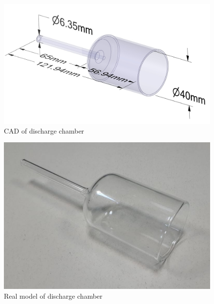 \begin{figure}[ht]
    \centering
    \includegraphics[scale=.45]{fig/DC_CAD.jpg}
    \caption{CAD of discharge chamber}
    \label{fig:DC_cad}
\end{figure}

\begin{figure}[ht]
    \centering
    \includegraphics[scale=.35]{fig/DC_real.jpeg}
    \caption{Real model of discharge chamber}
    \label{fig:DC_real}
\end{figure}

\newpage

